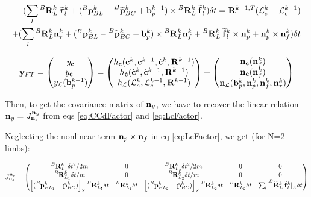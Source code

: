 \documentclass[11pt]{article}
\newcommand{\Rot}[2]{\prescript{#1}{}{\bfR}_{#2}}
\newcommand{\Rotm}[2]{\prescript{#1}{}{\widetilde{\bfR}}_{#2}}
\newcommand{\noise}{\bfn}
\newcommand{\bias}{\bfb}
\newcommand{\posi}[2]{\prescript{#1}{}{\bfp}_{#2}}
\newcommand{\posim}[2]{\prescript{#1}{}{\widetilde{\bfp}}_{#2}}
\newcommand{\posibar}{\bar{\bfp}}
\newcommand{\forcem}[2]{\prescript{#1}{}{\widetilde{\bff}}_{#2}}
\newcommand{\torquem}[2]{\prescript{#1}{}{\widetilde{\pmb{\tau}}}_{#2}}
\newcommand{\AM}{\mathcal{L}}
\newcommand{\COM}{\bfc}
\newcommand{\COMd}{\dot{\bfc}}
\begin{document}
\begin{small}
\begin{equation}
\begin{split}
	(\sum_l \Rot{B}{L}^{k}\torquem{}{l}^{k} + (\posi{B}{BL}^{k} - \posim{B}{BC}^{k} + \bias_{p}^{k-1}) \times \Rot{B}{L}^{k}\forcem{}{l}^{k}) \delta t = 
	\Rot{}{}^{k-1,T}(\AM_c^{k} - \AM_c^{k-1})
	\\
	+ (\sum_l \Rot{B}{L}^{k}\noise_{\tau}^{k} + (\posi{B}{BL}^{k} - \posim{B}{BC}^{k} + \bias_{p}^{k})\times \Rot{B}{L}^{k}\noise_f^{k}  + \Rot{B}{L}^{k}\forcem{}{l}^{k}  \times \noise_p^{k} + \noise^k_p \times \noise^k_f)\delta t
\end{split}
\label{eq:LcFactor}
\end{equation}
\end{small}

\begin{equation}
\bfy_{FT} =
\begin{pmatrix}
y_{\COM} \\ y_{\COMd} \\ y_{\AM}(\bias_{p}^{k-1})
\end{pmatrix}
=
\begin{pmatrix}
h_{\COM}(\COM^{k}, \COM^{k-1}, \COMd^{k}, \Rot{}{}^{k-1})
\\
h_{\COMd}(\COMd^{k}, \COMd^{k-1}, \Rot{}{}^{k-1}) 
\\
h_{\AM}(\AM_c^{k}, \AM_c^{k-1}, \Rot{}{}^{k-1})
\end{pmatrix}
+
\begin{pmatrix}
\noise_{\COM}(\noise_f^{k})
\\
\noise_{\COMd}(\noise_f^{k})
\\
\noise_{\AM}(\bias_{p}^k, \noise_p^k, \noise_f^{k}, \noise_\tau^{k})
\end{pmatrix}
\end{equation}

Then, to get the covariance matrix of $\noise_y$, we have to recover the linear relation $\noise_y = J^{\noise_y}_{\noise_z}$ from eqs \ref{eq:CCdFactor} and \ref{eq:LcFactor}.

Neglecting the nonlinear term $\noise_p \times \noise_f$ in eq \ref{eq:LcFactor}, we get (for N=2 limbs):

\begin{equation}
	J^{\noise_y}_{\noise_z} =
	\begin{pmatrix}
    \Rot{B}{L_1}^k \delta t^2/2m & 0 & \Rot{B}{L_2}^k \delta t^2/2m & 0 & 0 
    \\
    \Rot{B}{L_1}^k \delta t/m & 0 & \Rot{B}{L_2}^k \delta t/m & 0 & 0 
    \\
    \left[(\posim{B}{BL_1}^k - \posibar_{BC}^k) \right]_{\times} \Rot{B}{L_1}^k \delta t& \Rot{B}{L_1}^k \delta t& \left[(\posim{B}{BL_2}^k - \posibar_{BC}^k) \right]_{\times} \Rot{B}{L_2}^k \delta t & \Rot{B}{L_2}^k \delta t & \sum_l [\Rotm{B}{L}^k \forcem{}{l}^k]_{\times} \delta t
	\end{pmatrix}
\end{equation}
\end{document}
